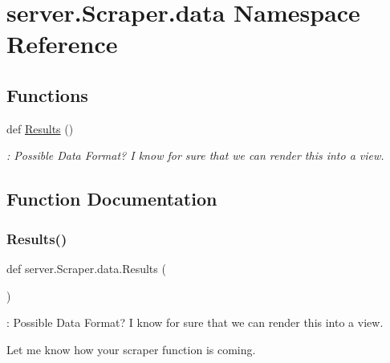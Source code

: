 \hypertarget{namespaceserver_1_1_scraper_1_1data}{}\section{server.\+Scraper.\+data Namespace Reference}
\label{namespaceserver_1_1_scraper_1_1data}
\subsection*{Functions}
\begin{DoxyCompactItemize}
\item 
def \mbox{\hyperlink{namespaceserver_1_1_scraper_1_1data_ada8a7f39b5f57a73f3e78023b91aa64e}{Results}} ()
\begin{DoxyCompactList}\small\item\em \+: Possible Data Format? I know for sure that we can render this into a view. \end{DoxyCompactList}\end{DoxyCompactItemize}


\subsection{Function Documentation}
\mbox{\label{namespaceserver_1_1_scraper_1_1data_ada8a7f39b5f57a73f3e78023b91aa64e}} 
\subsubsection{\texorpdfstring{Results()}{Results()}}
{\footnotesize\ttfamily def server.\+Scraper.\+data.\+Results (\begin{DoxyParamCaption}{ }\end{DoxyParamCaption})}



\+: Possible Data Format? I know for sure that we can render this into a view. 

Let me know how your scraper function is coming. 